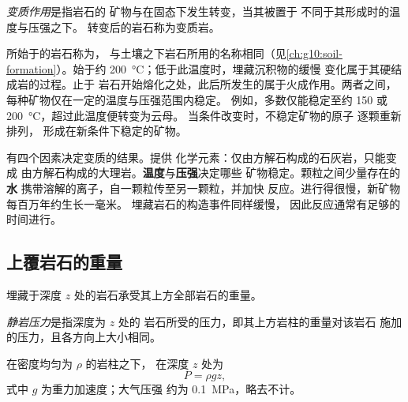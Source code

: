 \begin{definition}[变质作用]\label{def:g12:metamorphic-rocks:metamorphism}
\emph{变质作用}是指岩石的
矿物与在固态下发生转变，当其被置于
不同于其形成时的温度与压强之下。
转变后的岩石称为变质岩。
\end{definition}

所始于的岩石称为，
与土壤之下岩石所用的名称相同（见\cref{ch:g10:soil-formation}）。始于约 \qty{200}{\celsius}；低于此温度时，埋藏沉积物的缓慢
变化属于其硬结成岩的过程。止于
岩石开始熔化之处，此后所发生的属于火成作用。两者之间，
每种矿物仅在一定的温度与压强范围内稳定。
例如，多数仅能稳定至约 150 或 \qty{200}{\celsius}，超过此温度便转变为云母。
当条件改变时，不稳定矿物的原子
逐颗重新排列，
形成在新条件下稳定的矿物。

有四个因素决定变质的结果。\textbf{}提供
化学元素：仅由方解石构成的石灰岩，只能变成
由方解石构成的大理岩。\textbf{温度}与\textbf{压强}决定哪些
矿物稳定。颗粒之间少量存在的\textbf{水}
携带溶解的离子，自一颗粒传至另一颗粒，并加快
反应。进行得很慢，新矿物每百万年约生长一毫米。
埋藏岩石的构造事件同样缓慢，
因此反应通常有足够的时间进行。

\subsection{上覆岩石的重量}

埋藏于深度 $z$ 处的岩石承受其上方全部岩石的重量。

\begin{definition}[静岩压力]\label{def:g12:metamorphic-rocks:lithostatic}
\emph{静岩压力}是指深度为 $z$ 处的
岩石所受的压力，即其上方岩柱的重量对该岩石
施加的压力，且各方向上大小相同。
\end{definition}

\begin{proposition}[静岩压力]\label{prop:g12:metamorphic-rocks:lithostatic}
在密度均匀为 $\rho$ 的岩柱之下，
在深度 $z$ 处为
\[
  P = \rho g z ,
\]
式中 $g$ 为重力加速度；大气压强
约为 \qty{0.1}{MPa}，略去不计。
\end{proposition}


